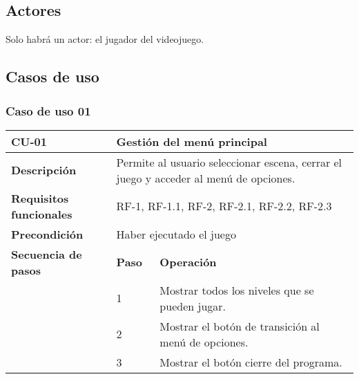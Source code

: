 \subsection{Actores}
Solo habrá un actor: el jugador del videojuego.
\subsection{Casos de uso}

\subsubsection{Caso de uso 01}
\begin{longtable}{lll}
\textbf{CU-01}                                   & \multicolumn{2}{l}{Gestión del menú principal}                                                                                       \\ \hline
\endfirsthead
%
\endhead
%
\textbf{Descripción}                             & \multicolumn{2}{l}{Permite al usuario seleccionar escena, cerrar el juego y acceder al menú de opciones.}                            \\ \hline
\textbf{Requisitos funcionales}                  & \multicolumn{2}{l}{RF-1, RF-1.1, RF-2, RF-2.1, RF-2.2, RF-2.3}                                                                       \\ \hline
\textbf{Precondición}                            & \multicolumn{2}{l}{Haber ejecutado el juego}                                                                                         \\ \hline
\multicolumn{1}{l|}{\textbf{Secuencia de pasos}} & \textbf{Paso}                                  & \textbf{Operación}                                                                  \\ \cline{2-3} 
\multicolumn{1}{l|}{}                            & 1                                              & Mostrar todos los niveles que se pueden jugar.                                      \\
\multicolumn{1}{l|}{}                            & 2                                              & Mostrar el botón de transición al menú de opciones.                                 \\
\multicolumn{1}{l|}{}                            & 3                                              & Mostrar el botón cierre del programa.                                               \\ \hline

\end{longtable}

